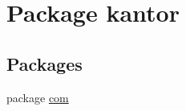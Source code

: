 \hypertarget{namespacekantor}{\section{Package kantor}
\label{namespacekantor}
}
\subsection*{Packages}
\begin{DoxyCompactItemize}
\item 
package \hyperlink{namespacekantor_1_1com}{com}
\end{DoxyCompactItemize}
